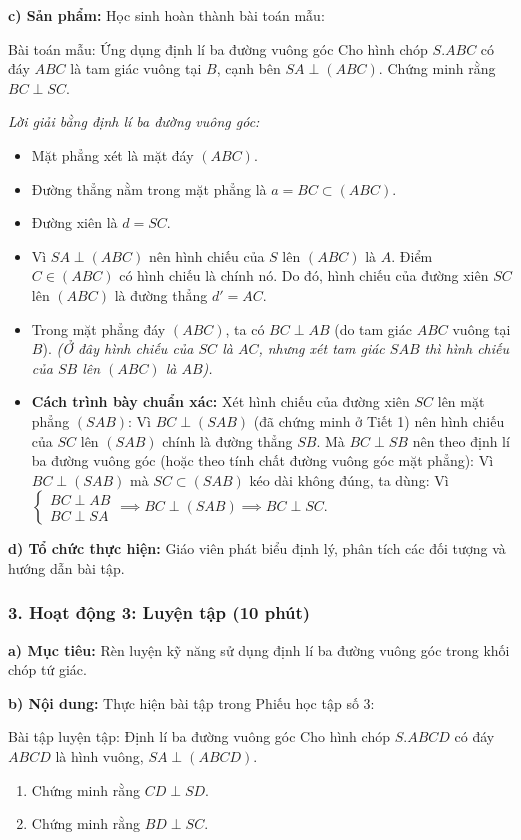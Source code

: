 \documentclass[12pt, a4paper]{article}
\begin{document}
\noindent \textbf{c) Sản phẩm:}
Học sinh hoàn thành bài toán mẫu:
\begin{pedabox}{Bài toán mẫu: Ứng dụng định lí ba đường vuông góc}
Cho hình chóp $S.ABC$ có đáy $ABC$ là tam giác vuông tại $B$, cạnh bên $SA \perp (ABC)$. Chứng minh rằng $BC \perp SC$.
\end{pedabox}
\textit{Lời giải bằng định lí ba đường vuông góc:}
\begin{itemize}
    \item Mặt phẳng xét là mặt đáy $(ABC)$.
    \item Đường thẳng nằm trong mặt phẳng là $a = BC \subset (ABC)$.
    \item Đường xiên là $d = SC$.
    \item Vì $SA \perp (ABC)$ nên hình chiếu của $S$ lên $(ABC)$ là $A$. Điểm $C \in (ABC)$ có hình chiếu là chính nó.
    Do đó, hình chiếu của đường xiên $SC$ lên $(ABC)$ là đường thẳng $d' = AC$.
    \item Trong mặt phẳng đáy $(ABC)$, ta có $BC \perp AB$ (do tam giác $ABC$ vuông tại $B$).
    \textit{(Ở đây hình chiếu của $SC$ là $AC$, nhưng xét tam giác $SAB$ thì hình chiếu của $SB$ lên $(ABC)$ là $AB$).}
    \item \textbf{Cách trình bày chuẩn xác:}
    Xét hình chiếu của đường xiên $SC$ lên mặt phẳng $(SAB)$:
    Vì $BC \perp (SAB)$ (đã chứng minh ở Tiết 1) nên hình chiếu của $SC$ lên $(SAB)$ chính là đường thẳng $SB$.
    Mà $BC \perp SB$ nên theo định lí ba đường vuông góc (hoặc theo tính chất đường vuông góc mặt phẳng):
    Vì $BC \perp (SAB)$ mà $SC \subset (SAB)$ kéo dài không đúng, ta dùng:
    Vì $\begin{cases} BC \perp AB \\ BC \perp SA \end{cases} \implies BC \perp (SAB) \implies BC \perp SC$.
\end{itemize}

\noindent \textbf{d) Tổ chức thực hiện:}
Giáo viên phát biểu định lý, phân tích các đối tượng và hướng dẫn bài tập.

\subsubsection*{3. Hoạt động 3: Luyện tập (10 phút)}

\noindent \textbf{a) Mục tiêu:}
Rèn luyện kỹ năng sử dụng định lí ba đường vuông góc trong khối chóp tứ giác.

\noindent \textbf{b) Nội dung:}
Thực hiện bài tập trong Phiếu học tập số 3:
\begin{pedabox}{Bài tập luyện tập: Định lí ba đường vuông góc}
Cho hình chóp $S.ABCD$ có đáy $ABCD$ là hình vuông, $SA \perp (ABCD)$.
\begin{enumerate}[leftmargin=0.6cm]
    \item Chứng minh rằng $CD \perp SD$.
    \item Chứng minh rằng $BD \perp SC$.
\end{enumerate}
\end{pedabox}
\end{document}
